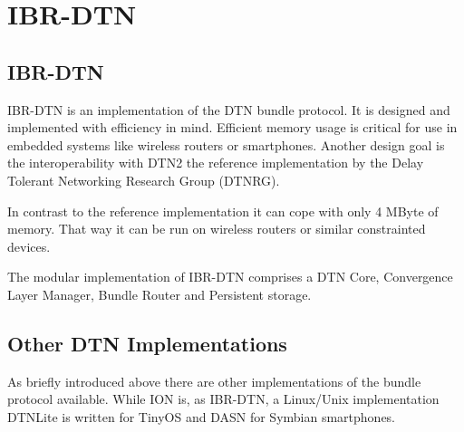 \chapter{IBR-DTN}
\label{ibr-dtn}
\section{IBR-DTN}

IBR-DTN is an implementation of the DTN bundle protocol. It is designed and
implemented with efficiency in mind. Efficient memory usage is critical for
use in embedded systems like wireless routers or smartphones. Another design
goal is the interoperability with DTN2 the reference implementation by the Delay
Tolerant Networking Research Group (DTNRG).

In contrast to the reference implementation it can cope with only 4 MByte of
memory. That way it can be run on wireless routers or similar constrainted
devices.

The modular implementation of IBR-DTN comprises a DTN Core, Convergence Layer
Manager, Bundle Router and Persistent storage.

\section{Other DTN Implementations}

As briefly introduced above there are other implementations of the bundle
protocol available. While ION is, as IBR-DTN, a Linux/Unix implementation
DTNLite is written for TinyOS and DASN for Symbian smartphones.
